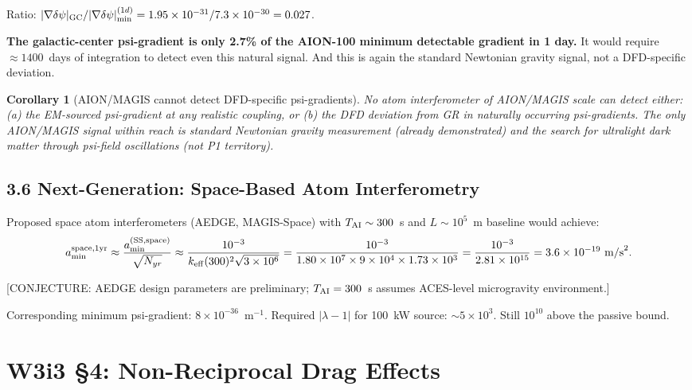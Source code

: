 \documentclass[11pt,twocolumn]{article}
\newcommand{\dpsi}{\delta\psi}
\newcommand{\lam}{\lambda}
\newtheorem{corollary}{Corollary}
\begin{document}
Ratio: $|\nabla\dpsi|_{\rm GC}/|\nabla\dpsi|_{\min}^{(1d)}
= 1.95\times10^{-31}/7.3\times10^{-30} = 0.027$.

\textbf{The galactic-center psi-gradient is only 2.7\% of the AION-100
minimum detectable gradient in 1 day.} It would require $\approx 1400$~days
of integration to detect even this natural signal. And this is again the
standard Newtonian gravity signal, not a DFD-specific deviation.

\begin{corollary}[AION/MAGIS cannot detect DFD-specific psi-gradients]
No atom interferometer of AION/MAGIS scale can detect either:
(a) the EM-sourced psi-gradient at any realistic coupling, or
(b) the DFD deviation from GR in naturally occurring psi-gradients.
The only AION/MAGIS signal within reach is standard Newtonian gravity
measurement (already demonstrated) and the search for ultralight dark
matter through psi-field oscillations (not P1 territory).
\label{cor:AION_limitation}
\end{corollary}

\subsection*{3.6 Next-Generation: Space-Based Atom Interferometry}

Proposed space atom interferometers (AEDGE, MAGIS-Space) with $T_{\rm AI}
\sim 300$~s and $L \sim 10^5$~m baseline would achieve:
\begin{equation}
a_{\min}^{\rm space,1yr} \approx \frac{a_{\min}^{(\rm SS,space)}}
{\sqrt{N_{yr}}}
\approx \frac{10^{-3}}{k_{\rm eff}(300)^2\sqrt{3\times10^6}}
= \frac{10^{-3}}{1.80\times10^7\times9\times10^4\times1.73\times10^3}
= \frac{10^{-3}}{2.81\times10^{15}}
= 3.6\times10^{-19}~\text{m/s}^2.
\end{equation}

\textcolor{conjecturecolor}{[CONJECTURE: AEDGE design parameters are
preliminary; $T_{\rm AI} = 300$~s assumes ACES-level microgravity
environment.]}

Corresponding minimum psi-gradient: $8\times10^{-36}$~m$^{-1}$.
Required $|\lam-1|$ for 100~kW source: $\sim5\times10^{3}$. Still
$10^{10}$ above the passive bound.

\section*{W3i3 \S4: Non-Reciprocal Drag Effects}
\label{sec:nonreciprocal}
\end{document}
